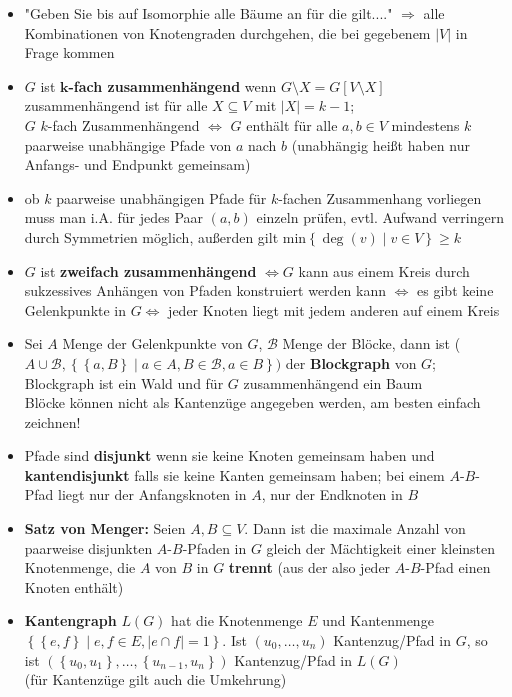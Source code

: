 \documentclass[10pt,a4paper]{article}
\begin{document}
\begin{itemize}
\item "Geben Sie bis auf Isomorphie alle Bäume an für die gilt...." $\Rightarrow$ alle Kombinationen von Knotengraden durchgehen, die bei gegebenem $\vert V\vert$ in Frage kommen 
\item $G$ ist $\boldsymbol{k}$\textbf{-fach zusammenhängend} wenn $G\setminus X=G[V\setminus X]$ zusammenhängend ist für alle $X\subseteq V$ mit $\vert X\vert=k -1$;\\ 
$G$ $k$-fach Zusammenhängend $\Leftrightarrow$ $G$ enthält für alle $a,b\in V$ mindestens $k$ paarweise unabhängige Pfade von $a$ nach $b$ (unabhängig heißt haben nur Anfangs- und Endpunkt gemeinsam)
\item ob $k$ paarweise unabhängigen Pfade für $k$-fachen Zusammenhang vorliegen muss man i.A. für jedes Paar $(a,b)$ einzeln prüfen, evtl. Aufwand verringern durch Symmetrien möglich, außerden gilt min$\left\lbrace \deg(v)\mid v\in V\right\rbrace \geq k$
\item $G$ ist \textbf{zweifach zusammenhängend}  $\Leftrightarrow G$ kann aus einem Kreis durch sukzessives Anhängen von Pfaden konstruiert werden kann $\Leftrightarrow$ es gibt keine Gelenkpunkte in $G\Leftrightarrow$ jeder Knoten liegt mit jedem anderen auf einem Kreis 
\item Sei $A$ Menge der Gelenkpunkte von $G$, $\mathcal{B}$ Menge der Blöcke, dann ist ($A\cup \mathcal{B}, \left\lbrace \left\lbrace a, B\right\rbrace \mid a\in A, B\in \mathcal{B}, a\in B\right\rbrace)$ der \textbf{Blockgraph} von $G$; Blockgraph ist ein Wald und  für $G$ zusammenhängend ein Baum\\
Blöcke können nicht als Kantenzüge angegeben werden, am besten einfach zeichnen!
\item Pfade sind \textbf{disjunkt} wenn sie keine Knoten gemeinsam haben und \textbf{kantendisjunkt} falls sie keine Kanten gemeinsam haben; bei einem $A$-$B$-Pfad liegt nur der Anfangsknoten in $A$, nur der Endknoten in $B$ 
\item \textbf{Satz von Menger:} Seien $A,B\subseteq V$. Dann ist die maximale Anzahl von paarweise disjunkten $A$-$B$-Pfaden in $G$ gleich der Mächtigkeit einer kleinsten Knotenmenge, die $A$ von $B$ in $G$ \textbf{trennt} (aus der also jeder $A$-$B$-Pfad einen Knoten enthält)
\item \textbf{Kantengraph} $L(G)$ hat die Knotenmenge $E$ und Kantenmenge $\left\lbrace \left\lbrace e,f \right\rbrace \mid e,f \in E, \vert e \cap f\vert =1\right\rbrace$. Ist $(u_{0},\dotsc, u_{n})$ Kantenzug/Pfad in $G$, so ist $(\left\lbrace  u_{0},u_{1}\right\rbrace,\dotsc, \left\lbrace u_{n-1},u_{n}\right\rbrace)$ Kantenzug/Pfad in $L(G)$\\ (für Kantenzüge gilt auch die Umkehrung)

\end{itemize}
\end{document}
